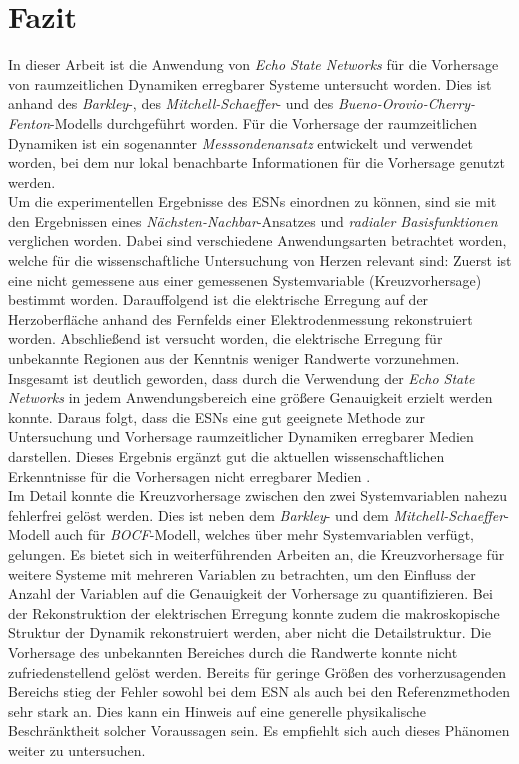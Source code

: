 \chapter{Fazit}
In dieser Arbeit ist die Anwendung von \textit{Echo State Networks} für die Vorhersage von raumzeitlichen Dynamiken erregbarer Systeme untersucht worden. Dies ist anhand des \textit{Barkley}-, des \textit{Mitchell-Schaeffer}- und des \textit{Bueno-Orovio-Cherry-Fenton}-Modells durchgeführt worden. Für die Vorhersage der raumzeitlichen Dynamiken ist ein sogenannter \textit{Messsondenansatz} entwickelt und verwendet worden, bei dem nur lokal benachbarte Informationen für die Vorhersage genutzt werden.\\

Um die experimentellen Ergebnisse des \textsc{ESN}s einordnen zu können, sind sie mit den Ergebnissen eines \textit{Nächsten-Nachbar}-Ansatzes und \textit{radialer Basisfunktionen} verglichen worden. Dabei sind verschiedene Anwendungsarten betrachtet worden, welche für die wissenschaftliche Untersuchung von Herzen relevant sind: Zuerst ist eine nicht gemessene aus einer gemessenen Systemvariable (Kreuzvorhersage) bestimmt worden. Darauffolgend ist die elektrische Erregung auf der Herzoberfläche anhand des Fernfelds einer Elektrodenmessung rekonstruiert worden. Abschließend ist versucht worden, die elektrische Erregung für unbekannte Regionen aus der Kenntnis weniger Randwerte vorzunehmen.\\

Insgesamt ist deutlich geworden, dass durch die Verwendung der \textit{Echo State Networks} in jedem Anwendungsbereich eine größere Genauigkeit erzielt werden konnte. Daraus folgt, dass die \textsc{ESN}s eine gut geeignete Methode zur Untersuchung und Vorhersage raumzeitlicher Dynamiken erregbarer Medien darstellen. Dieses Ergebnis ergänzt gut die aktuellen wissenschaftlichen Erkenntnisse für die Vorhersagen nicht erregbarer Medien \citep{Lu2017}.\\

Im Detail konnte die Kreuzvorhersage zwischen den zwei Systemvariablen nahezu fehlerfrei gelöst werden. Dies ist neben dem \textit{Barkley}- und dem \textit{Mitchell-Schaeffer}-Modell auch für \textit{BOCF}-Modell, welches über mehr Systemvariablen verfügt, gelungen. Es bietet sich in weiterführenden Arbeiten an, die Kreuzvorhersage für weitere Systeme mit mehreren Variablen zu betrachten, um den Einfluss der Anzahl der Variablen auf die Genauigkeit der Vorhersage zu quantifizieren. Bei der Rekonstruktion der elektrischen Erregung konnte zudem die makroskopische Struktur der Dynamik rekonstruiert werden, aber nicht die Detailstruktur. Die Vorhersage des unbekannten Bereiches durch die Randwerte konnte nicht zufriedenstellend gelöst werden. Bereits für geringe Größen des vorherzusagenden Bereichs stieg der Fehler sowohl bei dem \textsc{ESN} als auch bei den Referenzmethoden sehr stark an. Dies kann ein Hinweis auf eine generelle physikalische Beschränktheit solcher Voraussagen sein. Es empfiehlt sich auch dieses Phänomen weiter zu untersuchen. \\

